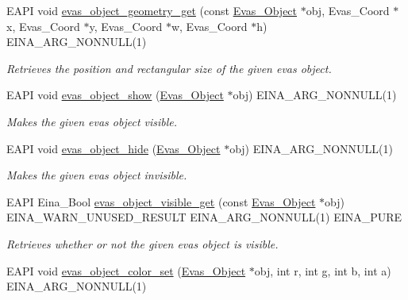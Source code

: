 \begin{DoxyCompactItemize}
EAPI void \hyperlink{group__Evas__Object__Group__Basic_ga5fa60c701af13dac5dd31071167309d2}{evas\_\-object\_\-geometry\_\-get} (const \hyperlink{group__Evas__Object__Group_ga9e19e6dd1f517a0ba437c0114d3e7c97}{Evas\_\-Object} $\ast$obj, Evas\_\-Coord $\ast$x, Evas\_\-Coord $\ast$y, Evas\_\-Coord $\ast$w, Evas\_\-Coord $\ast$h) EINA\_\-ARG\_\-NONNULL(1)
\begin{DoxyCompactList}\small\item\em Retrieves the position and rectangular size of the given evas object. \item\end{DoxyCompactList}\item 
EAPI void \hyperlink{group__Evas__Object__Group__Basic_ga769ad9a3e3daecb7a828196a2c86332f}{evas\_\-object\_\-show} (\hyperlink{group__Evas__Object__Group_ga9e19e6dd1f517a0ba437c0114d3e7c97}{Evas\_\-Object} $\ast$obj) EINA\_\-ARG\_\-NONNULL(1)
\begin{DoxyCompactList}\small\item\em Makes the given evas object visible. \item\end{DoxyCompactList}\item 
EAPI void \hyperlink{group__Evas__Object__Group__Basic_ga495807707f06f9acd4de8590a8c92148}{evas\_\-object\_\-hide} (\hyperlink{group__Evas__Object__Group_ga9e19e6dd1f517a0ba437c0114d3e7c97}{Evas\_\-Object} $\ast$obj) EINA\_\-ARG\_\-NONNULL(1)
\begin{DoxyCompactList}\small\item\em Makes the given evas object invisible. \item\end{DoxyCompactList}\item 
EAPI Eina\_\-Bool \hyperlink{group__Evas__Object__Group__Basic_ga9cf743b5d87b622c84ba591494445b49}{evas\_\-object\_\-visible\_\-get} (const \hyperlink{group__Evas__Object__Group_ga9e19e6dd1f517a0ba437c0114d3e7c97}{Evas\_\-Object} $\ast$obj) EINA\_\-WARN\_\-UNUSED\_\-RESULT EINA\_\-ARG\_\-NONNULL(1) EINA\_\-PURE
\begin{DoxyCompactList}\small\item\em Retrieves whether or not the given evas object is visible. \item\end{DoxyCompactList}\item 
EAPI void \hyperlink{group__Evas__Object__Group__Basic_ga6b2dfe01eb955cebf734f4e10ac9ce7f}{evas\_\-object\_\-color\_\-set} (\hyperlink{group__Evas__Object__Group_ga9e19e6dd1f517a0ba437c0114d3e7c97}{Evas\_\-Object} $\ast$obj, int r, int g, int b, int a) EINA\_\-ARG\_\-NONNULL(1)

\end{DoxyCompactItemize}
